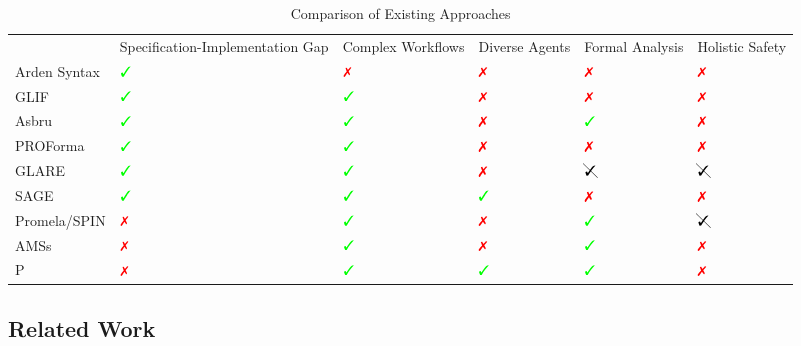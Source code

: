   \begin{table}
    \tiny
  \begin{tabularx}{\textwidth}{
      >{\centering\arraybackslash}X
    || >{\centering\arraybackslash}X
    | >{\centering\arraybackslash}X
    | >{\centering\arraybackslash}X
    | >{\centering\arraybackslash}X
    | >{\centering\arraybackslash}X
  }
                 & Specification-Implementation Gap  & Complex Workflows  & Diverse Agents   & Formal Analysis  & Holistic Safety  \\
    Arden Syntax & $\greencheck$                     & $\redcross$        & $\redcross$    & $\redcross$        & $\redcross$ \\
    GLIF         & $\greencheck$                     & $\greencheck$      & $\redcross$    & $\redcross$        & $\redcross$ \\
    Asbru        & $\greencheck$                     & $\greencheck$      & $\redcross$    & $\greencheck$      & $\redcross$ \\
    PROForma     & $\greencheck$                     & $\greencheck$      & $\redcross$    & $\redcross$        & $\redcross$ \\
    GLARE        & $\greencheck$                     & $\greencheck$      & $\redcross$    & $\cancelcheck$     & $\cancelcheck$ \\
    SAGE         & $\greencheck$                     & $\greencheck$      & $\greencheck$  & $\redcross$        & $\redcross$ \\
    Promela/SPIN & $\redcross$                       & $\greencheck$      & $\redcross$    & $\greencheck$      & $\cancelcheck$ \\
    AMSs         & $\redcross$                       & $\greencheck$      & $\redcross$    & $\greencheck$      & $\redcross$ \\
    P            & $\redcross$                       & $\greencheck$      & $\greencheck$  & $\greencheck$      & $\redcross$ \\
  \end{tabularx}
  \caption{Comparison of Existing Approaches}\label{table:existing-approaches}
  \end{table}

\subsection{Related Work}\label{subsec:related-work}

